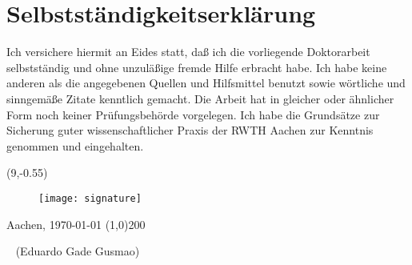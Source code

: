 \chapter*{Selbstst\"andigkeitserkl\"arung}

\graphicspath{{preamble/figs/}}

Ich versichere hiermit an Eides statt, da{\ss} ich die vorliegende Doktorarbeit selbstst\"andig und ohne unzul\"a{\ss}ige fremde Hilfe erbracht habe. Ich habe keine anderen als die angegebenen Quellen und \mbox{Hilfsmittel} benutzt sowie w\"ortliche und sinngem\"a{\ss}e Zitate kenntlich gemacht. Die Arbeit hat in \mbox{gleicher} oder \"ahnlicher Form noch keiner Pr\"ufungsbeh\"orde vorgelegen. Ich habe die Grunds\"atze zur Sicherung guter wissenschaftlicher Praxis der RWTH Aachen zur Kenntnis genommen und \linebreak eingehalten.

\vspace{2cm}

\begin{textblock}{5}(9,-0.55)
\begin{figure}[h!]
\texttt{[image: signature]}
\end{figure}
\end{textblock}

\hfill Aachen, \today \hspace{0.1cm} \line(1,0){200}

\ \hspace{9.3cm} (Eduardo Gade Gusmao)


